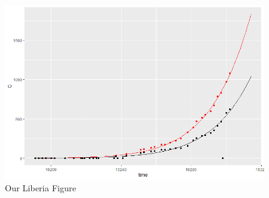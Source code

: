 \begin{figure}[h]
\centering
\includegraphics[width=0.7\linewidth]{./figures/my_fit_Lib}
\caption{Our Liberia Figure}
\label{fig:my_fit_Lib}
\end{figure}


